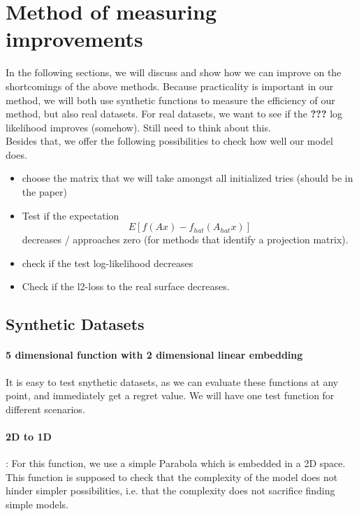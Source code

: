 \section{Method of measuring improvements}
In the following sections, we will discuss and show how we can improve on the shortcomings of the above methods.
Because practicality is important in our method, we will both use synthetic functions to measure the efficiency of our method, but also real datasets.
For real datasets, we want to see if the
\textbf{???} log likelihood improves (somehow).
Still need to think about this.\\

Besides that, we offer the following possibilities to check how well our model does.

\begin{itemize}
\item choose the matrix that we will take amongst all initialized tries (should be in the paper)
\item Test if the expectation $$ E[ f(A x) - f_{hat}(A_{hat} x) ] $$ decreases / approaches zero (for methods that identify a projection matrix).
\item check if the test log-likelihood decreases
\item Check if the l2-loss to the real surface decreases.
\end{itemize}



\subsection{Synthetic Datasets}
\paragraph{5 dimensional function with 2 dimensional linear embedding}

It is easy to test snythetic datasets, as we can evaluate these functions at any point, and immediately get a regret value.
We will have one test function for different scenarios.

\paragraph{2D to 1D}: For this function, we use a simple Parabola which is embedded in a 2D space.
This function is supposed to check that the complexity of the model does not hinder simpler possibilities, i.e. that the complexity does not sacrifice finding simple models.
